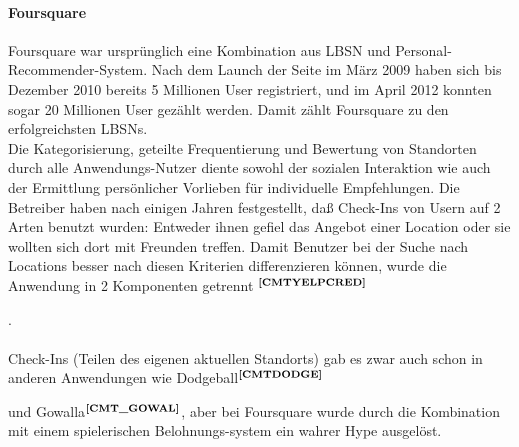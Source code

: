 \paragraph[Foursquare]{Foursquare}
\addtocounter{footnote}{1}%
\addtocounter{footnote}{1}%
Foursquare war ursprünglich eine Kombination aus LBSN und Personal-Recommender-System. Nach dem Launch der Seite im März 2009 haben sich bis Dezember 2010 bereits 5 Millionen User registriert, und im April 2012 konnten sogar 20 Millionen User gezählt werden. Damit zählt Foursquare zu den erfolgreichsten LBSNs.\\
Die Kategorisierung, geteilte Frequentierung und Bewertung von Standorten durch alle Anwendungs-Nutzer diente sowohl der sozialen Interaktion wie auch der Ermittlung persönlicher Vorlieben für individuelle Empfehlungen.
Die Betreiber haben nach einigen Jahren festgestellt, daß Check-Ins von Usern auf 2 Arten benutzt wurden: Entweder ihnen gefiel das Angebot einer Location oder sie wollten sich dort mit Freunden treffen. Damit Benutzer bei der Suche nach Locations besser nach diesen Kriterien differenzieren können, wurde die Anwendung in 2 Komponenten getrennt  $^{\textbf{\ref{CMTYELPCRED}}}$%
\addtocounter{footnote}{1}%
.
\\ \\
Check-Ins (Teilen des eigenen aktuellen Standorts) gab es zwar auch schon in anderen Anwendungen wie Dodgeball$^{\textbf{\ref{CMTDODGE}}}$%
\addtocounter{footnote}{1}%
 und Gowalla$^{\textbf{\ref{CMT_GOWAL}}}$,
aber bei Foursquare wurde durch die Kombination mit einem spielerischen Belohnungs-system ein wahrer Hype ausgelöst.
